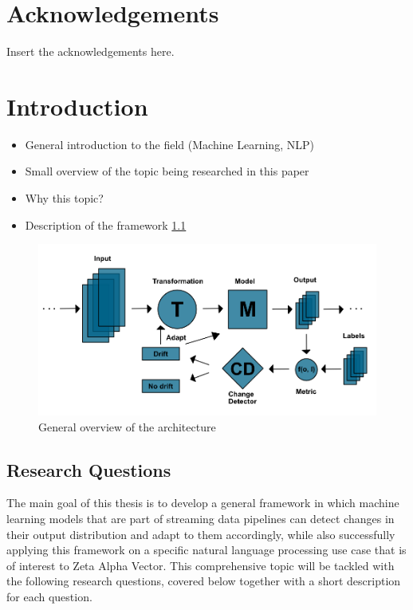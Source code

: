 \documentclass[12pt]{extreport}
\begin{document}
\chapter*{Acknowledgements}

Insert the acknowledgements here.

\tableofcontents

\listoffigures

\listoftables

\chapter{Introduction}

\begin{itemize}
    \item General introduction to the field (Machine Learning, NLP)
    \item Small overview of the topic being researched in this paper
    \item Why this topic?
    \item Description of the framework \ref{fig:framework}
\end{itemize}

\begin{figure}[h!]
\centering
\includegraphics[width=\linewidth]{assets/introduction/framework.png}
\caption{General overview of the architecture}
\label{fig:framework}
\end{figure}

\section{Research Questions}

The main goal of this thesis is to develop a general framework in which machine learning models that are part of streaming data pipelines can detect changes in their output distribution and adapt to them accordingly, while also successfully applying this framework on a specific natural language processing use case that is of interest to Zeta Alpha Vector. This comprehensive topic will be tackled with the following research questions, covered below together with a short description for each question.
\end{document}

